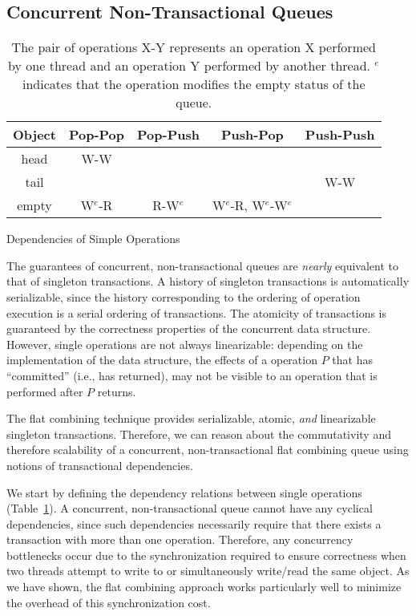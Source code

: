 \subsection{Concurrent Non-Transactional Queues}

\begin{table}
    \centering
\begin{tabular}{|c||c|c|c|c|}
    \hline
    Object & Pop-Pop & Pop-Push & Push-Pop & Push-Push\\
    \hline
    \hline
    head & W-W & & & \\
    \hline
    tail & & & & W-W\\
    \hline
    empty & W$^e$-R & R-W$^e$ & W$^e$-R, W$^e$-W$^e$ & \\
    \hline
\end{tabular}
    \caption{Dependencies of Simple Operations}
    \caption*{The pair of operations X-Y represents an operation X performed by one thread and an operation Y performed by another thread. $^e$ indicates that the operation modifies the empty status of the queue.}
    \label{table:simpledeps}
\end{table}

The guarantees of concurrent, non-transactional queues are \emph{nearly} equivalent to that of singleton transactions. A history of singleton transactions is automatically serializable, since the history corresponding to the ordering of operation execution is a serial ordering of transactions. The atomicity of transactions is guaranteed by the correctness properties of the concurrent data structure. However, single operations are not always linearizable: depending on the implementation of the data structure, the effects of a operation $P$ that has ``committed'' (i.e., has returned), may not be visible to an operation that is performed after $P$ returns.

The flat combining technique provides serializable, atomic, \emph{and} linearizable singleton transactions\cite{flatcombining}. Therefore, we can reason about the commutativity and therefore scalability of a concurrent, non-transactional flat combining queue using notions of transactional dependencies.

We start by defining the dependency relations between single operations (Table~\ref{table:simpledeps}). A concurrent, non-transactional queue cannot have any cyclical dependencies, since such dependencies necessarily require that there exists a transaction with more than one operation. Therefore, any concurrency bottlenecks occur due to the synchronization required to ensure correctness when two threads attempt to write to or simultaneously write/read the same object. As we have shown, the flat combining approach works particularly well to minimize the overhead of this synchronization cost.

